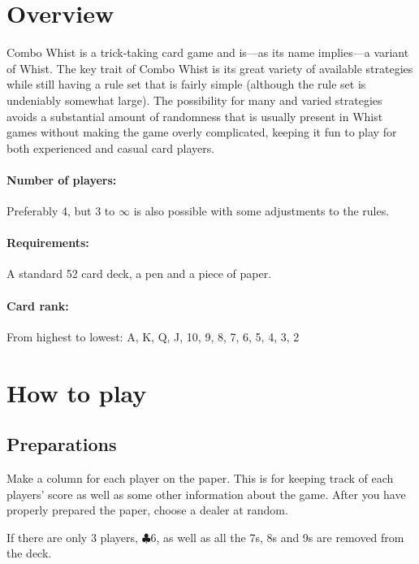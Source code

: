 \documentclass[a4paper]{article}
\author{By Joakim Nilsson}
\date{Development version (based on version \varVersion-\varLanguage)---\today}
\date{Version \varVersion-\varLanguage\---\today}
\begin{document}
	\introPages

	\noindent

	\pagebreak

	\section{Overview}
		Combo Whist is a trick-taking card game and is---as its name implies---a variant of Whist. The key trait of Combo Whist is its great variety of available strategies while still having a rule set that is fairly simple (although the rule set is undeniably somewhat large). The possibility for many and varied strategies avoids a substantial amount of randomness that is usually present in Whist games without making the game overly complicated, keeping it fun to play for both experienced and casual card players.

		\paragraph{Number of players:}
			Preferably 4, but 3 to $\infty$ is also possible with some adjustments to the rules.

		\paragraph{Requirements:}
			A standard 52 card deck, a pen and a piece of paper.

		\paragraph{Card rank:}
			From highest to lowest: A, K, Q, J, 10, 9, 8, 7, 6, 5, 4, 3, 2

	\section{How to play}
		\subsection{Preparations}
			Make a column for each player on the paper. This is for keeping track of each players' score as well as some other information about the game. After you have properly prepared the paper, choose a dealer at random.

			If there are only 3 players, $\clubsuit 6$, as well as all the 7s, 8s and 9s are removed from the deck.
\end{document}
